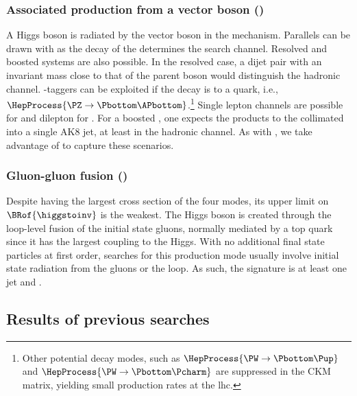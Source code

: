 

\subsubsection{Associated production from a vector boson (\texorpdfstring{\VH}{VH})}
\label{subsubsec:theory_hinv_VH_mode}

A Higgs boson is radiated by the vector boson \PVec in the \VH mechanism. Parallels can be drawn with \ttH as the decay of the \PVec determines the search channel. Resolved and boosted systems are also possible. In the resolved case, a dijet pair with an invariant mass close to that of the parent boson would distinguish the hadronic channel. \Pbottom-taggers can be exploited if the decay is to a \Pbottom quark, i.e., $\HepProcess{\PZ \to \Pbottom\APbottom}$.\footnote{Other potential decay modes, such as $\HepProcess{\PW \to \Pbottom\Pup}$ and $\HepProcess{\PW \to \Pbottom\Pcharm}$ are suppressed in the CKM matrix, yielding small production rates at the \acrshort{lhc}.} Single lepton channels are possible for \WH and dilepton for \ZH. For a boosted \PVec, one expects the products to the collimated into a single AK8 \gls{jet}, at least in the hadronic channel. As with \ttH, we take advantage of \deepakeight to capture these scenarios. 




\subsubsection{Gluon-gluon fusion (\texorpdfstring{\ggH}{ggH})}
\label{subsubsec:theory_hinv_ggF_mode}

Despite \ggH having the largest cross section of the four modes, its upper limit on $\BRof{\higgstoinv}$ is the weakest. The Higgs boson is created through the loop-level fusion of the initial state gluons, normally mediated by a top quark since it has the largest coupling to the Higgs. With no additional final state particles at first order, searches for this production mode usually involve initial state radiation from the gluons or the loop. As such, the signature is at least one \gls{jet} and \ptmiss.




\subsection{Results of previous searches}
\label{subsec:theory_hinv_prev_results}

